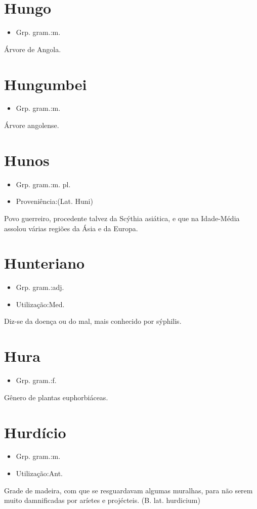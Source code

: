 \documentclass{article}
\begin{document}
\section{Hungo}
\begin{itemize}
\item {Grp. gram.:m.}
\end{itemize}
Árvore de Angola.
\section{Hungumbei}
\begin{itemize}
\item {Grp. gram.:m.}
\end{itemize}
Árvore angolense.
\section{Hunos}
\begin{itemize}
\item {Grp. gram.:m. pl.}
\end{itemize}
\begin{itemize}
\item {Proveniência:(Lat. \textunderscore Huni\textunderscore )}
\end{itemize}
Povo guerreiro, procedente talvez da Scýthia asiática, e que na Idade-Média assolou várias regiões da Ásia e da Europa.
\section{Hunteriano}
\begin{itemize}
\item {Grp. gram.:adj.}
\end{itemize}
\begin{itemize}
\item {Utilização:Med.}
\end{itemize}
Diz-se da doença ou do mal, mais conhecido por sýphilis.
\section{Hura}
\begin{itemize}
\item {Grp. gram.:f.}
\end{itemize}
Gênero de plantas euphorbiáceas.
\section{Hurdício}
\begin{itemize}
\item {Grp. gram.:m.}
\end{itemize}
\begin{itemize}
\item {Utilização:Ant.}
\end{itemize}
Grade de madeira, com que se resguardavam algumas muralhas, para não serem muito damnificadas por aríetes e projécteis.
(B. lat. \textunderscore hurdicium\textunderscore )
\end{document}
